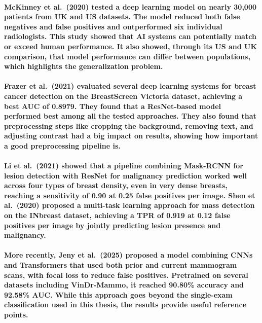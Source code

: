 \paragraph{McKinney et al. (2020) tested a deep learning model on nearly 30,000 patients from UK and US datasets. The model reduced both false negatives and false positives and outperformed six individual radiologists. This study showed that AI systems can potentially match or exceed human performance. It also showed, through its US and UK comparison, that model performance can differ between populations, which highlights the generalization problem.}

\paragraph{Frazer et al. (2021) evaluated several deep learning systems for breast cancer detection on the BreastScreen Victoria dataset, achieving a best AUC of 0.8979. They found that a ResNet-based model performed best among all the tested approaches. They also found that preprocessing steps like cropping the background, removing text, and adjusting contrast had a big impact on results, showing how important a good preprocessing pipeline is.}

\paragraph{Li et al. (2021) showed that a pipeline combining Mask-RCNN for lesion detection with ResNet for malignancy prediction worked well across four types of breast density, even in very dense breasts, reaching a sensitivity of 0.90 at 0.25 false positives per image. Shen et al. (2020) proposed a multi-task learning approach for mass detection on the INbreast dataset, achieving a TPR of 0.919 at 0.12 false positives per image by jointly predicting lesion presence and malignancy.}

\paragraph{More recently, Jeny et al. (2025) proposed a model combining CNNs and Transformers that used both prior and current mammogram scans, with focal loss to reduce false positives. Pretrained on several datasets including VinDr-Mammo, it reached 90.80\% accuracy and 92.58\% AUC. While this approach goes beyond the single-exam classification used in this thesis, the results provide useful reference points.}

